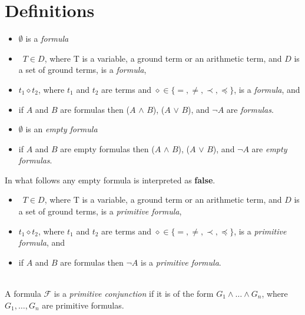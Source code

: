 \documentclass{llncs}
\title{}
\author{}
\newcommand{\ie}[1] {
  \begin{itemize}
    #1
  \end{itemize}
}
\begin{document}
\section{Definitions}
\begin{definition}[Formula] \label{formula}
{\rm
\ie{
\item $\emptyset$ is a {\em formula}
\item \ $T \in D$, where T is a variable, a %
ground term or an arithmetic term,
and $D$ is a set of %
ground terms, is a {\em formula},
\item  $t_1\diamond t_2$, where $t_1$ and $t_2$ are terms and
$\diamond \in \{ = ,\neq,  \prec, \preceq\}$, is a {\em formula}, and
\item if $A$ and $B$ are formulas then ($A$ $\land$ $B$), ($A$ $\lor$ $B$), and  $\neg A$ are {\em formulas}.
}
}
\end{definition}

\begin{definition} \label{empty formula}
\begin{itemize}
 \item $\emptyset$ is an  {\em empty formula}
 \item if $A$ and $B$ are empty formulas then ($A$ $\land$ $B$), ($A$ $\lor$ $B$), and  $\neg A$ are {\em empty formulas}.
\end{itemize}
 \end{definition}
 In what follows  any empty formula is interpreted as \textbf{false}.
 
 
 
 \begin{definition} \label{primitive formula}
  {\rm
\ie{
\item \ $T \in D$, where T is a variable, a %
ground term or an arithmetic term,
and $D$ is a set of %
ground terms, is a {\em primitive formula},
\item  $t_1\diamond t_2$, where $t_1$ and $t_2$ are terms and
$\diamond \in \{ = ,\neq,  \prec, \preceq\}$, is a {\em primitive formula}, and
\item if $A$ and $B$ are formulas then    $\neg A$  is a {\em  primitive formula}.
}
}
 \end{definition}
 


 \begin{definition} \label{primitive conjunction}\\
 {\rm
  A formula $\mathcal{F}$ is  a \textit{primitive conjunction} if it is of the form $G_1 \land \dots \land G_n$, where $G_1,\dots,G_n$ are primitive formulas.
}
 \end{definition}
 
\end{document}
